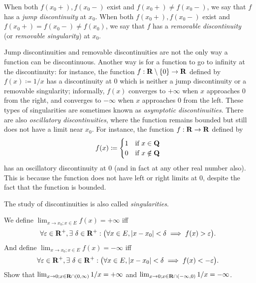 \begin{note}
    When both \(f(x_0+), f(x_0-)\) exist and \(f(x_0+) \neq f(x_0-)\), we say that \(f\) has a \emph{jump discontinuity} at \(x_0\).
    When both \(f(x_0+), f(x_0-)\) exist and \(f(x_0+) = f(x_0-) \neq f(x_0)\), we say that \(f\) has a \emph{removable discontinuity} (or \emph{removable singularity}) at \(x_0\).
\end{note}

\begin{remark}\label{9.5.4}
    Jump discontinuities and removable discontinuities are not the only way a function can be discontinuous.
    Another way is for a function to go to infinity at the discontinuity:
    for instance, the function \(f : \mathbf{R} \setminus \{0\} \to \mathbf{R}\) defined by \(f(x) \coloneqq 1 / x\) has a discontinuity at \(0\) which is neither a jump discontinuity or a removable singularity;
    informally, \(f(x)\) converges to \(+\infty\) when \(x\) approaches \(0\) from the right, and converges to \(-\infty\) when \(x\) approaches \(0\) from the left.
    These types of singularities are sometimes known as \emph{asymptotic discontinuities}.
    There are also \emph{oscillatory discontinuities}, where the function remains bounded but still does not have a limit near \(x_0\).
    For instance, the function \(f : \mathbf{R} \to \mathbf{R}\) defined by
    \[
        f(x) \coloneqq \begin{cases}
            1 & \text{if } x \in \mathbf{Q}    \\
            0 & \text{if } x \notin \mathbf{Q}
        \end{cases}
    \]
    has an oscillatory discontinuity at \(0\) (and in fact at any other real number also).
    This is because the function does not have left or right limits at \(0\), despite the fact that the function is bounded.
\end{remark}

\begin{note}
    The study of discontinuities is also called \emph{singularities}.
\end{note}

\begin{additional corollary}\label{ac 9.5.2}
We define \(\lim_{x \to x_0 ; x \in E} f(x) = +\infty\) iff
\[
    \forall \varepsilon \in \R^+, \exists\ \delta \in \R^+ : \big(\forall x \in E, \abs{x - x_0} < \delta \implies f(x) > \varepsilon\big).
\]
And define \(\lim_{x \to x_0 ; x \in E} f(x) = -\infty\) iff
\[
    \forall \varepsilon \in \R^+, \exists\ \delta \in \R^+ : \big(\forall x \in E, \abs{x - x_0} < \delta \implies f(x) < -\varepsilon\big).
\]
Show that \(\lim_{x \to 0 ; x \in \mathbf{R} \cap (0, \infty)} 1 / x = +\infty\) and \(\lim_{x \to 0 ; x \in \mathbf{R} \cap (-\infty, 0)} 1 / x = -\infty\).
\end{additional corollary}

